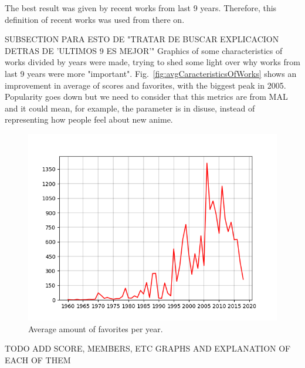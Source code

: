 The best result was given by recent works from last 9 years. Therefore, this definition of recent works was used from there on.

SUBSECTION PARA ESTO DE "TRATAR DE BUSCAR EXPLICACION DETRAS DE 'ULTIMOS 9 ES MEJOR'"
Graphics of some characteristics of works divided by years were made, trying to shed some light over why works from last 9 years were more "important". Fig.~\ref{fig:avgCaracteristicsOfWorks} shows an improvement in average of scores and favorites, with the biggest peak in 2005. Popularity goes down but we need to consider that this metrics are from MAL and it could mean, for example, the parameter is in disuse, instead of representing how people feel about new anime.

\begin{figure}[!hbt]
	\begin{center}
	\includegraphics[width=\columnwidth]{graphics/avgFavorites.png}
	\caption{Average amount of favorites per year.}
	\label{fig:avgFavorites}
	\end{center}
\end{figure}

TODO ADD SCORE, MEMBERS, ETC GRAPHS AND EXPLANATION OF EACH OF THEM

